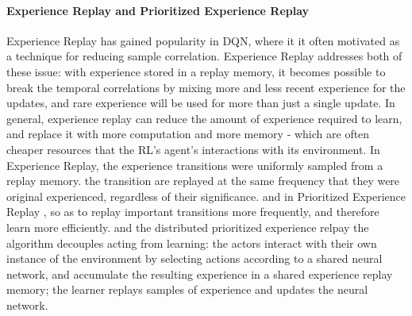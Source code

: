 \paragraph{Experience Replay and Prioritized Experience Replay} Experience Replay  \cite{wang2016sample} has gained popularity in DQN, where it it often motivated as a technique for reducing sample correlation. Experience Replay addresses both of these issue: with experience stored in a replay memory, it becomes possible to break the temporal correlations by mixing more and less recent experience for the updates, and rare experience will be used for more than just a single update. In general, experience replay can reduce the amount of experience required to learn, and replace it with more computation and more memory - which are often cheaper resources that the RL's agent's interactions with its environment. In Experience Replay, the experience transitions were uniformly sampled from a replay memory. the transition are replayed at the same frequency that they were original experienced, regardless of their significance.
and in Prioritized Experience Replay \cite{schaul2015prioritized}, so as to replay important transitions more frequently, and therefore learn more efficiently. and the distributed prioritized experience relpay \cite{horgan2018distributed} the algorithm decouples acting from learning: the actors interact with their own instance of the environment by selecting actions according to a shared neural network, and accumulate the resulting experience in a shared experience replay memory; the learner replays samples of experience and updates the neural network. 